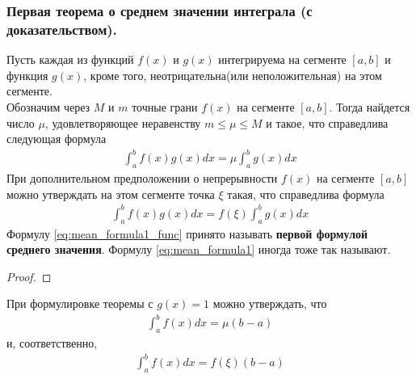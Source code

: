 \documentclass[10pt]{article}
\begin{document}
    \subsubsection{Первая теорема о среднем значении интеграла (с доказательством).}
    \begin{theorem}
            Пусть каждая из функций $f(x)$ и $g(x)$ интегрируема на сегменте $[a, b]$ и функция $g(x)$, кроме того, неотрицательна(или неположительная) на этом сегменте.\\
            Обозначим через $M$ и $m$ точные грани $f(x)$ на сегменте $[a, b]$. Тогда найдется число $\mu$, удовлетворяющее неравенству $m \leq \mu \leq M$ и такое, что справедлива следующая формула
            \begin{gather}
                \int_a^b f(x)g(x) dx = \mu \int_a^b g(x) dx \label{eq:mean_formula1}
            \end{gather}
            При дополнительном предположении о непрерывности $f(x)$ на сегменте $[a, b]$ можно утверждать на этом сегменте точка $\xi$ такая, что справедлива формула
            \begin{gather}
                \int_a^b f(x)g(x) dx = f(\xi) \int_a^b g(x) dx \label{eq:mean_formula1_func}
            \end{gather}
            Формулу \ref{eq:mean_formula1_func} принято называть \textbf{первой формулой среднего значения}. Формулу \ref{eq:mean_formula1} иногда тоже так называют.
    \end{theorem}
    \begin{proof}
    \end{proof}
    \begin{corollary}
        При формулировке теоремы с $g(x) = 1$ можно утверждать, что
        \begin{gather*}
            \int_a^b f(x) dx = \mu (b-a)
        \end{gather*}
        и, соответственно,
        \begin{gather*}
            \int_a^b f(x) dx = f(\xi)(b-a)
        \end{gather*}
    \end{corollary}
\end{document}
